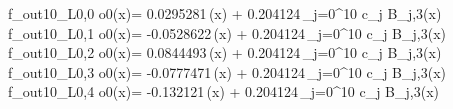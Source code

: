 f_{out10_L0,0	o0}(x)= 0.0295281\,\phi(x) + 0.204124\,\sum_{j=0}^{10} c_j B_{j,3}(x)
f_{out10_L0,1	o0}(x)= -0.0528622\,\phi(x) + 0.204124\,\sum_{j=0}^{10} c_j B_{j,3}(x)
f_{out10_L0,2	o0}(x)= 0.0844493\,\phi(x) + 0.204124\,\sum_{j=0}^{10} c_j B_{j,3}(x)
f_{out10_L0,3	o0}(x)= -0.0777471\,\phi(x) + 0.204124\,\sum_{j=0}^{10} c_j B_{j,3}(x)
f_{out10_L0,4	o0}(x)= -0.132121\,\phi(x) + 0.204124\,\sum_{j=0}^{10} c_j B_{j,3}(x)
